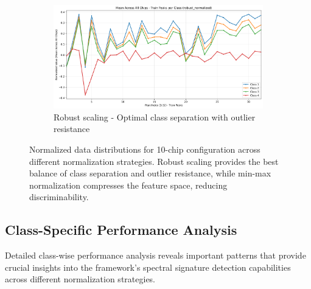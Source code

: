 \begin{figure}[htbp]
    \vspace{0.5cm}

    \begin{subfigure}[b]{0.7\textwidth}
        \centering
        \includegraphics[width=\textwidth]{out/10chips/robust_normalized/normalized_data_distribution_robust_normalized.png}
        \caption{Robust scaling - Optimal class separation with outlier resistance}
    \end{subfigure}

    \caption{Normalized data distributions for 10-chip configuration across different normalization strategies. Robust scaling provides the best balance of class separation and outlier resistance, while min-max normalization compresses the feature space, reducing discriminability.}
    \label{fig:10chip_normalization_comparison}
\end{figure}

\subsection{Class-Specific Performance Analysis}

Detailed class-wise performance analysis reveals important patterns that provide crucial insights into the framework's spectral signature detection capabilities across different normalization strategies.

